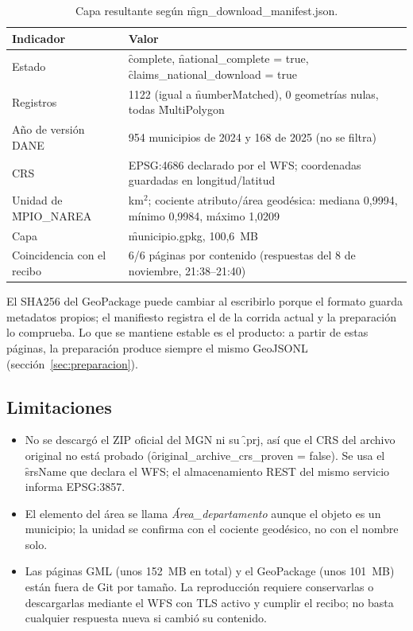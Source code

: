 \begin{table}[htbp]
\centering\small
\caption{Capa resultante según \f{mgn\_download\_manifest.json}.}
\begin{tabularx}{\textwidth}{@{}P{5.6cm} L@{}}
\toprule
Indicador & Valor \\
\midrule
Estado & \f{complete}, \f{national\_complete = true}, \f{claims\_national\_download = true} \\
Registros & 1122 (igual a \f{numberMatched}), 0 geometrías nulas, todas \f{MultiPolygon} \\
Año de versión DANE & 954 municipios de 2024 y 168 de 2025 (no se filtra) \\
CRS & EPSG:4686 declarado por el WFS; coordenadas guardadas en longitud/latitud \\
Unidad de \f{MPIO\_NAREA} & km$^2$; cociente atributo/área geodésica: mediana 0,9994, mínimo 0,9984, máximo 1,0209 \\
Capa & \f{municipio.gpkg}, 100,6~MB \\
Coincidencia con el recibo & 6/6 páginas por contenido (respuestas del 8 de noviembre, 21:38--21:40) \\
\bottomrule
\end{tabularx}
\end{table}

El SHA256 del GeoPackage puede cambiar al escribirlo porque el formato guarda metadatos propios; el manifiesto registra el de la corrida actual y la preparación lo comprueba. Lo que se mantiene estable es el producto: a partir de estas páginas, la preparación produce siempre el mismo GeoJSONL (sección~\ref{sec:preparacion}).

\subsection{Limitaciones}

\begin{itemize}
  \item No se descargó el ZIP oficial del MGN ni su \f{.prj}, así que el CRS del archivo original no está probado (\f{original\_archive\_crs\_proven = false}). Se usa el \f{srsName} que declara el WFS; el almacenamiento REST del mismo servicio informa EPSG:3857.
  \item El elemento del área se llama \emph{Área\_departamento} aunque el objeto es un municipio; la unidad se confirma con el cociente geodésico, no con el nombre solo.
  \item Las páginas GML (unos 152~MB en total) y el GeoPackage (unos 101~MB) están fuera de Git por tamaño. La reproducción requiere conservarlas o descargarlas mediante el WFS con TLS activo y cumplir el recibo; no basta cualquier respuesta nueva si cambió su contenido.
\end{itemize}

